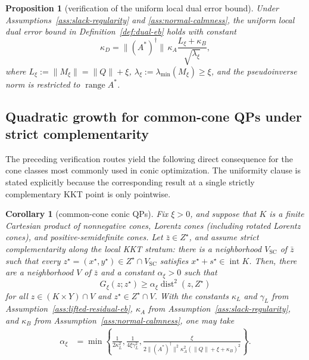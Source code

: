 \documentclass[letterpaper]{article} %
\newtheorem{proposition}[theorem]{Proposition}
\newtheorem{corollary}[theorem]{Corollary}
\theoremstyle{definition}
\theoremstyle{remark}
\begin{document}
\begin{proposition}[verification of the uniform local dual error bound]
\label{prop:dual-eb}
Under Assumptions~\ref{ass:slack-regularity} and
\ref{ass:normal-calmness}, the uniform local dual error bound in
Definition~\ref{def:dual-eb} holds with constant
\[
    \kappa_D
    =
    \|(A^*)^\dagger\|\,\kappa_A
    \frac{L_\xi+\kappa_B}{\sqrt{\lambda_\xi}},
\]
where $L_\xi:=\|M_\xi\| = \|Q\| + \xi$, $\lambda_\xi:=\lambda_{\min}(M_\xi) \geq \xi$, and the
pseudoinverse norm is restricted to $\operatorname{range}A^*$.
\end{proposition}

\subsection{Quadratic growth for common-cone QPs under strict complementarity}

The preceding verification routes yield the following direct consequence
for the cone classes most commonly used in conic optimization.  The
uniformity clause is stated explicitly because the corresponding result at
a single strictly complementary KKT point is only pointwise.

\begin{corollary}[common-cone conic QPs]
\label{cor:common-cone-qg}
Fix $\xi>0$, and suppose that $K$ is a finite Cartesian product of
nonnegative cones, Lorentz cones (including rotated Lorentz cones), and
positive-semidefinite cones.  Let $\bar z\in Z^\star$, and assume strict
complementarity along the local KKT stratum: there is a neighborhood
$V_{\mathrm{SC}}$ of $\bar z$ such that every
$z^\star=(x^\star,y^\star)\in Z^\star\cap V_{\mathrm{SC}}$ satisfies
$x^\star+s^\star\in\operatorname{int}K$.
Then,
there are a neighborhood $V$ of $\bar z$ and a constant $\alpha_\xi>0$ such
that
\[
    G_\xi(z;z^\star)
    \ge
    \alpha_\xi\operatorname{dist}^2(z,Z^\star)
\]
for all $z\in(K\times Y)\cap V$ and
$z^\star\in Z^\star\cap V$. With the constants $\kappa_L$ and $\gamma_L$
from Assumption~\ref{ass:lifted-residual-eb}, $\kappa_A$ from Assumption~\ref{ass:slack-regularity}, and $\kappa_B$ from Assumption~\ref{ass:normal-calmness}, one may take
\begin{equation}
\label{eq:common-cone-qg-constant}
\begin{aligned}
    \alpha_\xi
    &=
    \min\left\{
        \frac{1}{2\kappa_L^2},
        \frac{1}{4\xi\gamma_L^2},
        \frac{\xi}
        {2\|(A^*)^\dagger\|^2\kappa_A^2(\|Q\| + \xi+\kappa_B)^2}
    \right\}.
\end{aligned}
\end{equation}
\end{corollary}
\end{document}
